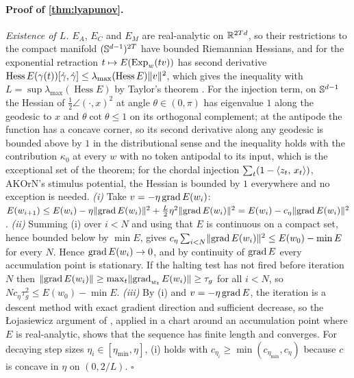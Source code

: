 \paragraph{Proof of \cref{thm:lyapunov}.}
\emph{Existence of $L$.} $E_A$, $E_C$ and $E_M$ are real-analytic on $\mathbb{R}^{2Td}$, so their
restrictions to the compact manifold $(\mathbb{S}^{d-1})^{2T}$ have bounded Riemannian Hessians, and for the
exponential retraction $t\mapsto E(\operatorname{Exp}_w(tv))$ has second derivative
$\operatorname{Hess}E(\gamma(t))[\dot\gamma,\dot\gamma]\le\lambda_{\max}(\operatorname{Hess}E)\lVert v\rVert^2$,
which gives the inequality with $L=\sup\lambda_{\max}(\operatorname{Hess}E)$ by Taylor's theorem
\citep[Ch.~10]{boumal2023}. For the injection term, on $\mathbb{S}^{d-1}$ the Hessian of
$\tfrac12\angle(\cdot,x)^2$ at angle $\theta\in(0,\pi)$ has eigenvalue $1$ along the geodesic to $x$
and $\theta\cot\theta\le1$ on its orthogonal complement; at the antipode the function has a concave
corner, so its second derivative along any geodesic is bounded above by $1$ in the distributional
sense and the inequality holds with the contribution $\kappa_0$ at every $w$ with no token antipodal
to its input, which is the exceptional set of the theorem; for the chordal injection
$\sum_t(1-\langle z_t,\, x_t\rangle)$, AKOrN's stimulus potential, the Hessian is bounded by $1$ everywhere and
no exception is needed.
\emph{(i)} Take $v=-\eta\operatorname{grad} E(w_i)$:
$E(w_{i+1})\le E(w_i)-\eta\lVert \operatorname{grad} E(w_i)\rVert^2+\tfrac L2\eta^2\lVert \operatorname{grad} E(w_i)\rVert^2=E(w_i)-c_\eta\lVert \operatorname{grad} E(w_i)\rVert^2$.
\emph{(ii)} Summing (i) over $i<N$ and using that $E$ is continuous on a compact set, hence bounded
below by $\min E$, gives $c_\eta\sum_{i<N}\lVert \operatorname{grad} E(w_i)\rVert^2\le E(w_0)-\min E$ for every $N$. Hence
$\operatorname{grad} E(w_i)\to0$, and by continuity of $\operatorname{grad} E$ every accumulation point is stationary. If the
halting test has not fired before iteration $N$ then $\lVert \operatorname{grad} E(w_i)\rVert\ge\max_t\lVert \operatorname{grad}_{w_t}E(w_i)\rVert\ge\tau_g$
for all $i<N$, so $Nc_\eta\tau_g^2\le E(w_0)-\min E$. \emph{(iii)} By (i) and $v=-\eta\operatorname{grad} E$, the
iteration is a descent method with exact gradient direction and sufficient decrease, so the
Łojasiewicz argument of \citet{absil2005analytic}, applied in a chart around an accumulation point
where $E$ is real-analytic, shows that the sequence has finite length and converges. For decaying
step sizes $\eta_i\in[\eta_{\min},\eta]$, (i) holds with $c_{\eta_i}\ge\min(c_{\eta_{\min}},c_\eta)$
because $c$ is concave in $\eta$ on $(0,2/L)$. \hfill$\square$


